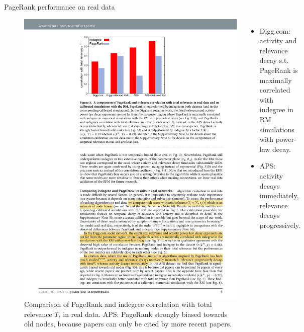 \begin{frame}{PageRank performance on real data}
    \begin{figure}
        \begin{columns}
                \includegraphics[width=1.1\textwidth]{figures/PageRank_realdata}
                \begin{footnotesize}
                    \begin{itemize}
                        \item \alert{Digg.com}: activity and relevance decay s.t. PageRank is maximally correlated with indegree in RM simulations with power-law decay.
                        \item \alert{APS}: \\ activity decays immediately, \\ relevance decays progressively.
                    \end{itemize}
                \end{footnotesize}
        \end{columns}
        \caption{Comparison of PageRank and indegree correlation with total relevance $T_i$ in real data. APS: PageRank strongly biased towards old nodes, because papers can only be cited by more recent papers.}
    \end{figure}
\end{frame}
